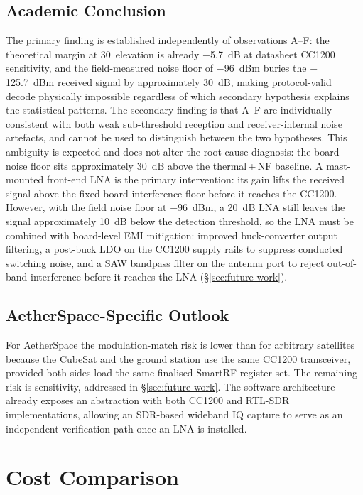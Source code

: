 \subsection{Academic Conclusion}

The primary finding is established independently of observations A--F: the theoretical margin at 30\degree\ elevation is already $-$5.7~dB at datasheet CC1200 sensitivity, and the field-measured noise floor of $-$96~dBm buries the $-$125.7~dBm received signal by approximately 30~dB, making protocol-valid decode physically impossible regardless of which secondary hypothesis explains the statistical patterns. The secondary finding is that A--F are individually consistent with both weak sub-threshold reception and receiver-internal noise artefacts, and cannot be used to distinguish between the two hypotheses. This ambiguity is expected and does not alter the root-cause diagnosis: the board-noise floor sits approximately 30~dB above the thermal\,+\,NF baseline. A mast-mounted front-end LNA is the primary intervention: its gain lifts the received signal above the fixed board-interference floor before it reaches the CC1200. However, with the field noise floor at $-$96~dBm, a 20~dB LNA still leaves the signal approximately 10~dB below the detection threshold, so the LNA must be combined with board-level EMI mitigation: improved buck-converter output filtering, a post-buck LDO on the CC1200 supply rails to suppress conducted switching noise, and a SAW bandpass filter on the antenna port to reject out-of-band interference before it reaches the LNA (\S\ref{sec:future-work}).

\subsection{AetherSpace-Specific Outlook}

For AetherSpace the modulation-match risk is lower than for arbitrary satellites because the CubeSat and the ground station use the same CC1200 transceiver, provided both sides load the same finalised SmartRF register set. The remaining risk is sensitivity, addressed in \S\ref{sec:future-work}. The software architecture already exposes an  abstraction with both CC1200 and RTL-SDR implementations, allowing an SDR-based wideband IQ capture to serve as an independent verification path once an LNA is installed.

\section{Cost Comparison}


